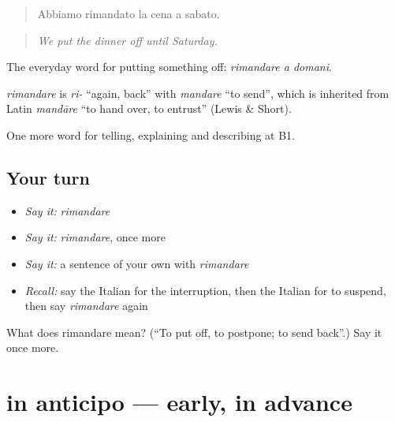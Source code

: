\begin{quote}
Abbiamo rimandato la cena a sabato.
\end{quote}

\begin{quote}
\emph{We put the dinner off until Saturday.}
\end{quote}

The everyday word for putting something off: \emph{rimandare a domani}.

\begin{cousinweb}
\emph{rimandare} is \emph{ri-} \textquotedblleft{}again, back\textquotedblright{} with \emph{mandare} \textquotedblleft{}to send\textquotedblright{}, which is inherited from Latin \emph{mandāre} \textquotedblleft{}to hand over, to entrust\textquotedblright{} (Lewis \& Short).
\end{cousinweb}

\begin{grammarlens}[title={What you've built}]
One more word for telling, explaining and describing at B1.
\end{grammarlens}

\subsection*{Your turn}
\begin{itemize}
\raggedright
  \item \emph{Say it:} \emph{rimandare}
  \item \emph{Say it:} \emph{rimandare}, once more
  \item \emph{Say it:} a sentence of your own with \emph{rimandare}
  \item \emph{Recall:} say the Italian for the interruption, then the Italian for to suspend, then say \emph{rimandare} again
\end{itemize}

\begin{tcolorbox}[breakable,colback=teal!4,colframe=teal!35!black,title={Before you move on}]
What does rimandare mean? (\textquotedblleft{}To put off, to postpone; to send back\textquotedblright{}.) Say it once more.
\end{tcolorbox}
\section[in anticipo]{in anticipo — early, in advance}

\label{lesson:IT-C279-in-anticipo}



